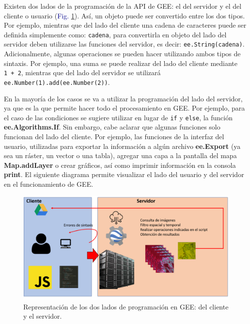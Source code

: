 \documentclass[
  12pt,
  letterpaper,
  twoside]{book}
\newcommand\boldpurple[1]{\textcolor{darkpurple}{\textbf{#1}}}
\begin{document}
Existen dos lados de la programación de la API de GEE: el del servidor y el del cliente o usuario (\textcolor{darkblue}{Fig.} \ref{fig:f51}). Así, un objeto puede ser convertido entre los dos tipos. Por ejemplo, mientras que del lado del cliente una cadena de caracteres puede ser definida simplemente como: \texttt{\textquotesingle{}cadena\textquotesingle{}}, para convertirla en objeto del lado del servidor deben utilizarse las funciones del servidor, es decir: \texttt{ee.String(\textquotesingle{}cadena\textquotesingle{})}. Adicionalmente, algunas operaciones se pueden hacer utilizando ambos tipos de sintaxis. Por ejemplo, una suma se puede realizar del lado del cliente mediante \texttt{1\ +\ 2}, mientras que del lado del servidor se utilizará \texttt{ee.Number(1).add(ee.Number(2))}.

En la mayoría de los casos se va a utilizar la programación del lado del servidor, ya que es la que permite hacer todo el procesamiento en GEE. Por ejemplo, para el caso de las condiciones se sugiere utilizar en lugar de \texttt{if} y \texttt{else}, la función \boldpurple{ee.Algorithms.If}. Sin embargo, cabe aclarar que algunas funciones solo funcionan del lado del cliente. Por ejemplo, las funciones de la interfaz del usuario, utilizadas para exportar la información a algún archivo \boldpurple{ee.Export} (ya sea un ráster, un vector o una tabla), agregar una capa a la pantalla del mapa \boldpurple{Map.addLayer} o crear gráficos, así como imprimir información en la consola \boldpurple{print}. El siguiente diagrama permite visualizar el lado del usuario y del servidor en el funcionamiento de GEE.

\begin{figure}[H]

{\centering \includegraphics[width=0.95\linewidth]{Img/daigFunc} 

}

\caption{Representación de los dos lados de programación en GEE: del cliente y el servidor.}\label{fig:f51}
\end{figure}
\end{document}
